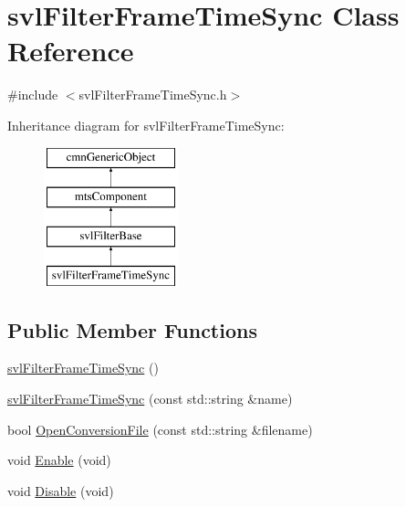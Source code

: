 \hypertarget{classsvl_filter_frame_time_sync}{\section{svl\-Filter\-Frame\-Time\-Sync Class Reference}
\label{classsvl_filter_frame_time_sync}
}


{\ttfamily \#include $<$svl\-Filter\-Frame\-Time\-Sync.\-h$>$}

Inheritance diagram for svl\-Filter\-Frame\-Time\-Sync\-:\begin{figure}[H]
\begin{center}
\leavevmode
\includegraphics[height=4.000000cm]{dd/d8b/classsvl_filter_frame_time_sync}
\end{center}
\end{figure}
\subsection*{Public Member Functions}
\begin{DoxyCompactItemize}
\item 
\hyperlink{classsvl_filter_frame_time_sync_ad2c7fddf56a45877ad618c2b120b313b}{svl\-Filter\-Frame\-Time\-Sync} ()
\item 
\hyperlink{classsvl_filter_frame_time_sync_a6aeb2c033e06ee808ff33ce8685f6f5e}{svl\-Filter\-Frame\-Time\-Sync} (const std\-::string \&name)
\item 
bool \hyperlink{classsvl_filter_frame_time_sync_a7831489f935622201e7d62c31bde6e55}{Open\-Conversion\-File} (const std\-::string \&filename)
\item 
void \hyperlink{classsvl_filter_frame_time_sync_a5c209c39f49db44fea13d897912147aa}{Enable} (void)
\item 
void \hyperlink{classsvl_filter_frame_time_sync_a51f92f69df3bda0cabe4c3c1022d67fd}{Disable} (void)
\end{DoxyCompactItemize}

